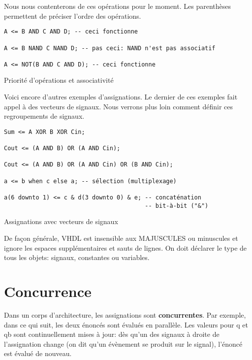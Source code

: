 \documentclass[letter, oneside]{book}
\begin{document}
Nous nous contenterons de ces opérations pour le moment. Les
parenthèses permettent de préciser l'ordre des opérations.

\begin{listing}[htbp]
\begin{verbatim}
A <= B AND C AND D; -- ceci fonctionne

A <= B NAND C NAND D; -- pas ceci: NAND n'est pas associatif

A <= NOT(B AND C AND D); -- ceci fonctionne
\end{verbatim}
\caption{Priorité d'opérations et associativité}
\end{listing}

Voici encore d'autres exemples d'assignations.  Le dernier de ces
exemples fait appel à des vecteurs de signaux. Nous verrons plus loin
comment définir ces regroupements de signaux.


\begin{listing}[htbp]
\begin{verbatim}
Sum <= A XOR B XOR Cin;

Cout <= (A AND B) OR (A AND Cin);

Cout <= (A AND B) OR (A AND Cin) OR (B AND Cin);

a <= b when c else a; -- sélection (multiplexage)

a(6 downto 1) <= c & d(3 downto 0) & e; -- concaténation 
                                        -- bit-à-bit ("&")

\end{verbatim}
\caption{Assignations avec vecteurs de signaux}
\end{listing}

De façon générale, VHDL est insensible aux MAJUSCULES ou minuscules
et ignore les espaces supplémentaires et sauts de lignes. On doit
déclarer le type de tous les objets: signaux, constantes ou variables.

\section{Concurrence}
\label{sec:org1938d32}

Dans un corps d'architecture, les assignations sont
\textbf{concurrentes}. Par exemple, dans ce qui suit, les deux énoncés sont
évalués en parallèle. Les valeurs pour q et qb sont continuellement
mises à jour: dès qu'un des signaux à droite de l'assignation change
(on dit qu'un évènement se produit sur le signal), l'énoncé est évalué
de nouveau.
\end{document}
